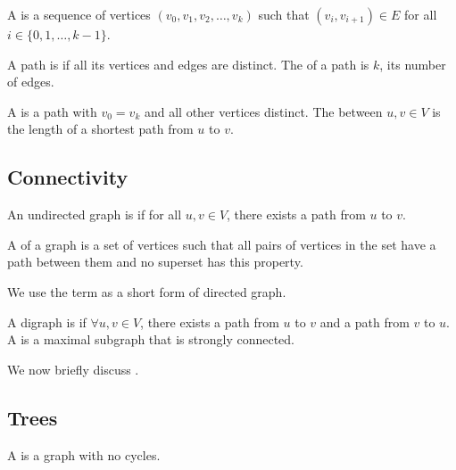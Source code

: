 \documentclass[12pt]{scrartcl}
\begin{document}
\begin{definition}
    A  is a sequence of vertices $(v_0, v_1, v_2, \ldots, v_k)$ such that $(v_i, v_{i+1}) \in E$ for all $i \in \{0, 1, \ldots, k-1\}$.
\end{definition}

\begin{definition}
    A path is  if all its vertices and edges are distinct. The  of a path is $k$, its number of edges.
\end{definition}

\begin{definition}
    A  is a path with $v_0 = v_k$ and all other vertices distinct. The  between $u, v \in V$ is the length of a shortest path from $u$ to $v$.
\end{definition}

\subsection{Connectivity}
\begin{definition}
    An undirected graph is  if for all $u, v \in V$, there exists a path from $u$ to $v$.
\end{definition}

\begin{definition}
    A  of a graph is a set of vertices such that all pairs of vertices in the set have a path between them and no superset has this property.
\end{definition}

\begin{remark}
    We use the term  as a short form of directed graph. 
\end{remark}

\begin{definition}
    A digraph is  if $\forall u, v \in V$, there exists a path from $u$ to $v$ and a path from $v$ to $u$. A  is a maximal subgraph that is strongly connected.
\end{definition}

We now briefly discuss .

\subsection{Trees}

\begin{definition}
    A  is a graph with no cycles.
\end{definition}
\end{document}
